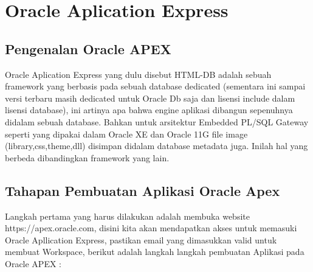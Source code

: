 \chapter{Oracle Aplication Express}

\section{Pengenalan Oracle APEX}

Oracle Aplication Express\cite{OracleApex} yang dulu disebut HTML-DB adalah sebuah framework yang berbasis pada sebuah database dedicated (sementara ini sampai versi terbaru masih dedicated untuk Oracle Db saja dan lisensi include dalam lisensi database), ini artinya apa bahwa engine aplikasi dibangun sepenuhnya didalam sebuah database. Bahkan untuk arsitektur Embedded PL/SQL Gateway seperti yang dipakai dalam Oracle XE dan Oracle 11G file image (library,css,theme,dll) disimpan didalam database metadata juga. Inilah hal yang berbeda dibandingkan framework yang lain.

\section{Tahapan Pembuatan Aplikasi Oracle Apex}
Langkah pertama yang harus dilakukan adalah membuka website https://apex.oracle.com, disini kita akan mendapatkan akses untuk memasuki Oracle Apllication Express, pastikan email yang dimasukkan valid untuk membuat Workspace, berikut adalah langkah langkah pembuatan Aplikasi pada Oracle APEX :

